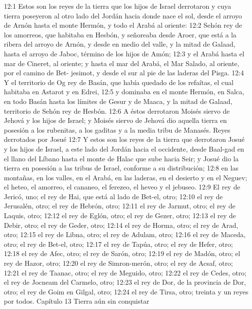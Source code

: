 12:1 Estos son los reyes de la tierra que los hijos de Israel derrotaron y cuya tierra poseyeron al otro lado del Jordán hacia donde nace el sol, desde el arroyo de Arnón hasta el monte Hermón, y todo el Arabá al oriente:  
12:2 Sehón rey de los amorreos, que habitaba en Hesbón, y señoreaba desde Aroer, que está a la ribera del arroyo de Arnón, y desde en medio del valle, y la mitad de Galaad, hasta el arroyo de Jaboc, término de los hijos de Amón;  
12:3 y el Arabá hasta el mar de Cineret, al oriente; y hasta el mar del Arabá, el Mar Salado, al oriente, por el camino de Bet- jesimot, y desde el sur al pie de las laderas del Pisga.  
12:4 Y el territorio de Og rey de Basán, que había quedado de los refaítas, el cual habitaba en Astarot y en Edrei, 
12:5 y dominaba en el monte Hermón, en Salca, en todo Basán hasta los límites de Gesur y de Maaca, y la mitad de Galaad, territorio de Sehón rey de Hesbón. 
12:6 A éstos derrotaron Moisés siervo de Jehová y los hijos de Israel; y Moisés siervo de Jehová dio aquella tierra en posesión a los rubenitas, a los gaditas y a la media tribu de Manasés.  
Reyes derrotados por Josué  
12:7 Y estos son los reyes de la tierra que derrotaron Josué y los hijos de Israel, a este lado del Jordán hacia el occidente, desde Baal-gad en el llano del Líbano hasta el monte de Halac que sube hacia Seir; y Josué dio la tierra en posesión a las tribus de Israel, conforme a su distribución;  
12:8 en las montañas, en los valles, en el Arabá, en las laderas, en el desierto y en el Neguev; el heteo, el amorreo, el cananeo, el ferezeo, el heveo y el jebuseo.  
12:9 El rey de Jericó, uno; el rey de Hai, que está al lado de Bet-el, otro;  
12:10 el rey de Jerusalén, otro; el rey de Hebrón, otro;  
12:11 el rey de Jarmut, otro; el rey de Laquis, otro;  
12:12 el rey de Eglón, otro; el rey de Gezer, otro;  
12:13 el rey de Debir, otro; el rey de Geder, otro;  
12:14 el rey de Horma, otro; el rey de Arad, otro;  
12:15 el rey de Libna, otro; el rey de Adulam, otro;  
12:16 el rey de Maceda, otro; el rey de Bet-el, otro;  
12:17 el rey de Tapúa, otro; el rey de Hefer, otro;  
12:18 el rey de Afec, otro; el rey de Sarón, otro;  
12:19 el rey de Madón, otro; el rey de Hazor, otro;  
12:20 el rey de Simron-merón, otro; el rey de Acsaf, otro;  
12:21 el rey de Taanac, otro; el rey de Meguido, otro;  
12:22 el rey de Cedes, otro; el rey de Jocneam del Carmelo, otro;  
12:23 el rey de Dor, de la provincia de Dor, otro; el rey de Goim en Gilgal, otro;  
12:24 el rey de Tirsa, otro; treinta y un reyes por todos.  
Capítulo 13
Tierra aún sin conquistar  

